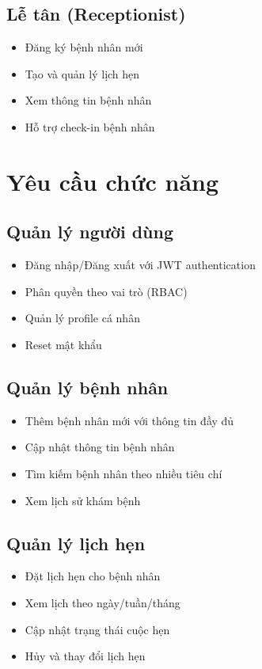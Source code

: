 \documentclass[12pt,a4paper]{report}
\begin{document}
\subsection{Lễ tân (Receptionist)}
\begin{itemize}
    \item Đăng ký bệnh nhân mới
    \item Tạo và quản lý lịch hẹn
    \item Xem thông tin bệnh nhân
    \item Hỗ trợ check-in bệnh nhân
\end{itemize}

\section{Yêu cầu chức năng}

\subsection{Quản lý người dùng}
\begin{itemize}
    \item Đăng nhập/Đăng xuất với JWT authentication
    \item Phân quyền theo vai trò (RBAC)
    \item Quản lý profile cá nhân
    \item Reset mật khẩu
\end{itemize}

\subsection{Quản lý bệnh nhân}
\begin{itemize}
    \item Thêm bệnh nhân mới với thông tin đầy đủ
    \item Cập nhật thông tin bệnh nhân
    \item Tìm kiếm bệnh nhân theo nhiều tiêu chí
    \item Xem lịch sử khám bệnh
\end{itemize}

\subsection{Quản lý lịch hẹn}
\begin{itemize}
    \item Đặt lịch hẹn cho bệnh nhân
    \item Xem lịch theo ngày/tuần/tháng
    \item Cập nhật trạng thái cuộc hẹn
    \item Hủy và thay đổi lịch hẹn
\end{itemize}
\end{document}
